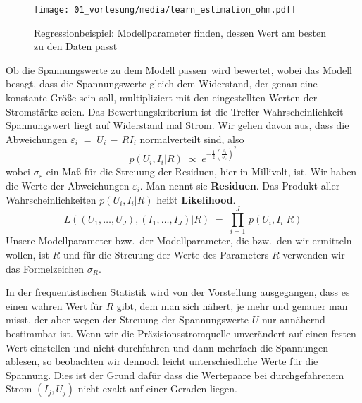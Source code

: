 \begin{figure}
\begin{center}
\texttt{[image: 01\_vorlesung/media/learn\_estimation\_ohm.pdf]}
\caption{Regressionbeispiel: Modellparameter finden, dessen Wert am besten zu den Daten passt}
\label{Ohm1}
\end{center}
\end{figure}

Ob die Spannungswerte zu dem Modell \glqq passen\grqq ~wird bewertet, wobei das Modell
besagt, dass die Spannungswerte gleich dem Widerstand, der genau eine konstante Größe sein soll,
multipliziert mit den eingestellten Werten der Stromstärke seien. Das Bewertungskriterium ist
\glqq die Treffer-Wahrscheinlichkeit Spannungswert liegt auf Widerstand mal Strom\grqq.
Wir gehen davon aus, dass die Abweichungen $\varepsilon_i \; = \; U_i \, - \, R I_i$ normalverteilt sind, also
\begin{equation}
p(U_i,I_i | R) \; \propto \; e^{-\frac{1}{2} \left(\frac{\varepsilon_i}{\sigma_\varepsilon}\right)^2}
\end{equation}
wobei $\sigma_\varepsilon$ ein Maß für die Streuung der Residuen, hier in Millivolt, ist.
Wir haben die Werte der Abweichungen $\varepsilon_i$. Man nennt sie \textbf{Residuen}.
Das Produkt aller Wahrscheinlichkeiten $p(U_i,I_i | R)$ heißt \textbf{Likelihood}.
\begin{equation}
L((U_1,\dots, U_J), (I_1,\dots,I_J) | R) \; = \; \prod\limits_{i = 1}^J \, p(U_i,I_i | R)
\end{equation}
Unsere Modellparameter bzw.\ der Modellparameter, die bzw.\ den wir ermitteln wollen, ist $R$ und
für die Streuung der Werte des Parameters $R$ verwenden wir das Formelzeichen $\sigma_R$.

In der frequentistischen Statistik wird von der Vorstellung ausgegangen, dass es einen wahren Wert für
$R$ gibt, dem man sich nähert, je mehr und genauer man misst, der aber wegen der Streuung
der Spannungswerte $U$ nur annähernd bestimmbar ist. Wenn wir die Präzisionsstromquelle unverändert
auf einen festen Wert einstellen und nicht durchfahren und dann mehrfach die Spannungen ablesen, so
beobachten wir dennoch leicht unterschiedliche Werte für die Spannung. Dies ist der Grund dafür
dass die Wertepaare bei durchgefahrenem Strom $(I_j, U_j)$ nicht exakt auf einer Geraden liegen.

